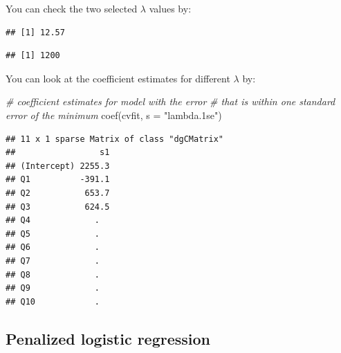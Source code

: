 \documentclass[
  12pt,
]{krantz}
\makeatletter
\newenvironment{Shaded}{\begin{snugshade}}{\end{snugshade}}
\newcommand{\AttributeTok}[1]{\textcolor[rgb]{0.61,0.61,0.61}{#1}}
\newcommand{\CommentTok}[1]{\textcolor[rgb]{0.37,0.37,0.37}{\textit{#1}}}
\newcommand{\FloatTok}[1]{\textcolor[rgb]{0.06,0.06,0.06}{#1}}
\newcommand{\FunctionTok}[1]{\textcolor[rgb]{0,0,0}{#1}}
\newcommand{\NormalTok}[1]{#1}
\newcommand{\SpecialCharTok}[1]{\textcolor[rgb]{0,0,0}{#1}}
\newcommand{\StringTok}[1]{\textcolor[rgb]{0.5,0.5,0.5}{#1}}
\newenvironment{kframe}{%
\medskip{}
\setlength{\fboxsep}{.8em}
 \def\at@end@of@kframe{}%
 \ifinner\ifhmode%
  \def\at@end@of@kframe{\end{minipage}}%
  \begin{minipage}{\columnwidth}%
 \fi\fi%
 \def\FrameCommand##1{\hskip\@totalleftmargin \hskip-\fboxsep
 \colorbox{shadecolor}{##1}\hskip-\fboxsep
     \hskip-\linewidth \hskip-\@totalleftmargin \hskip\columnwidth}%
 \MakeFramed {\advance\hsize-\width
   \@totalleftmargin\z@ \linewidth\hsize
   \@setminipage}}%
 {\par\unskip\endMakeFramed%
 \at@end@of@kframe}
\renewenvironment{Shaded}{\begin{kframe}}{\end{kframe}}
\makeatother
\begin{document}
You can check the two selected \(\lambda\) values by:

\begin{Shaded}
\end{Shaded}

\begin{verbatim}
## [1] 12.57
\end{verbatim}

\begin{Shaded}
\end{Shaded}

\begin{verbatim}
## [1] 1200
\end{verbatim}

You can look at the coefficient estimates for different \(\lambda\) by:

\begin{Shaded}
\begin{Highlighting}[]
\CommentTok{\# coefficient estimates for model with the error }
\CommentTok{\# that is within one standard error of the minimum}
\FunctionTok{coef}\NormalTok{(cvfit, }\AttributeTok{s =} \StringTok{"lambda.1se"}\NormalTok{)}
\end{Highlighting}
\end{Shaded}

\begin{verbatim}
## 11 x 1 sparse Matrix of class "dgCMatrix"
##                 s1
## (Intercept) 2255.3
## Q1          -391.1
## Q2           653.7
## Q3           624.5
## Q4             .  
## Q5             .  
## Q6             .  
## Q7             .  
## Q8             .  
## Q9             .  
## Q10            .
\end{verbatim}

\hypertarget{penalized-logistic-regression}{%
\subsection{Penalized logistic regression}\label{penalized-logistic-regression}}
\end{document}
